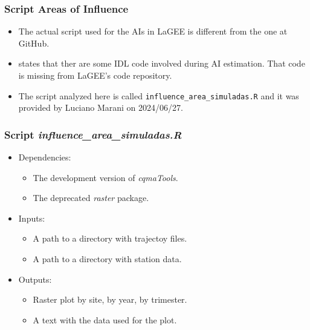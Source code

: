 \documentclass[aspectratio=169]{beamer}
\begin{document}
\begin{frame}[fragile]
    \frametitle{Script Areas of Influence}
    \begin{itemize}
        \item The actual script used for the AIs in LaGEE is different 
            from the one at GitHub.
        \item \citeauthor{cassol2020} states that ther are some IDL code
            involved during AI estimation. That code is missing from LaGEE's 
            code repository.
        \item The script analyzed here is called 
            \verb|influence_area_simuladas.R| and it was provided by Luciano 
            Marani on 2024/06/27.
    \end{itemize}
\end{frame}

\begin{frame}[fragile]
    \frametitle{Script \textit{influence\_area\_simuladas.R}}
    \begin{itemize}
        \item Dependencies:
            \begin{itemize}
                \item The development version of \textit{cqmaTools}.
                \item The deprecated \textit{raster} package.
            \end{itemize}
        \item Inputs:
            \begin{itemize}
                \item A path to a directory with trajectoy files.
                \item A path to a directory with station data. 
            \end{itemize}
        \item Outputs:
            \begin{itemize}
                \item Raster plot by site, by year, by trimester.
                \item A text with the data used for the plot.
            \end{itemize}
    \end{itemize}
\end{frame}
\end{document}
